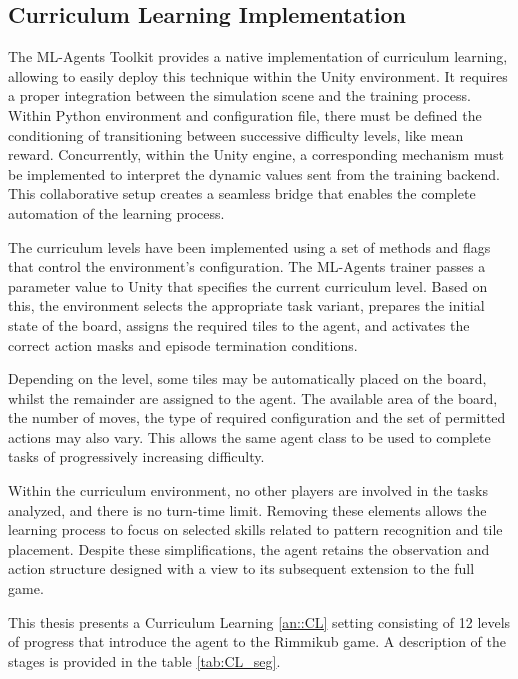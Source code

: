 \subsection{Curriculum Learning Implementation}
The ML-Agents Toolkit provides a native implementation of curriculum learning, allowing to easily deploy this technique within the Unity environment. It requires a proper integration between the simulation scene and the training process. Within Python environment and configuration file, there must be defined the conditioning of transitioning between successive difficulty levels, like mean reward. Concurrently, within the Unity engine, a corresponding mechanism must be implemented to interpret the dynamic values sent from the training backend. This collaborative setup creates a seamless bridge that enables the complete automation of the learning process.

The curriculum levels have been implemented using a set of methods and flags that control the environment’s configuration. The ML-Agents trainer passes a parameter value to Unity that specifies the current curriculum level. Based on this, the environment selects the appropriate task variant, prepares the initial state of the board, assigns the required tiles to the agent, and activates the correct action masks and episode termination conditions.

Depending on the level, some tiles may be automatically placed on the board, whilst the remainder are assigned to the agent. The available area of the board, the number of moves, the type of required configuration and the set of permitted actions may also vary. This allows the same agent class to be used to complete tasks of progressively increasing difficulty.

Within the curriculum environment, no other players are involved in the tasks analyzed, and there is no turn-time limit. Removing these elements allows the learning process to focus on selected skills related to pattern recognition and tile placement. Despite these simplifications, the agent retains the observation and action structure designed with a view to its subsequent extension to the full game.

This thesis presents a Curriculum Learning \ref{an::CL} setting consisting of 12 levels of progress that introduce the agent to the Rimmikub game. A description of the stages is provided in the table \ref{tab:CL_seg}. 

